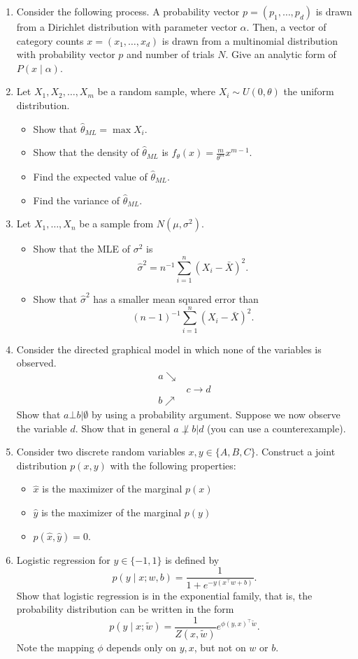 \documentclass{article}
\begin{document}
\begin{enumerate}
\item
Consider the following process.  A probability vector $p=(p_1, \ldots, p_d)$ is drawn from a Dirichlet distribution with parameter vector $\alpha$.
Then, a vector of category counts $x=(x_1, \ldots, x_d)$ is drawn from a multinomial distribution with probability vector $p$ and number of trials $N$. Give an analytic form of $P(x \mid \alpha)$.  

\item
Let $X_1, X_2, \ldots, X_m$ be a random sample, where $X_i \sim U(0,\theta)$ the uniform distribution.
\begin{itemize}
\item Show that $\hat\theta_{ML} = \max X_i$.
\item Show that the density of $\hat\theta_{ML}$ is $f_\theta(x) = \frac{m}{\theta^m} x^{m-1}$.
\item Find the expected value of $\hat\theta_{ML}$.
\item Find the variance of $\hat\theta_{ML}$.
\end{itemize}

\item
Let $X_1, \ldots, X_n$ be a sample from $N(\mu, \sigma^2)$.
\begin{itemize}
\item Show that the MLE of $\sigma^2$ is
$${\hat\sigma}^2 = n^{-1} \sum_{i=1}^n (X_i - \bar X)^2.$$
\item Show that ${\hat\sigma}^2$ has a smaller mean squared error than 
$$(n-1)^{-1} \sum_{i=1}^n (X_i - \bar X)^2.$$
\end{itemize}

\item
Consider the directed graphical model in which none of the variables is observed.  
$$
\begin{array}{cc}
a \searrow &  \\
& c \rightarrow d \\
b \nearrow &
\end{array}
$$
Show that $a \bot b \vert \emptyset$ by using a probability argument.
Suppose we now observe the variable $d$.  Show that in general $a \not\perp b \vert d$ (you can use a counterexample).

\item
Consider two discrete random variables $x,y \in \{A,B,C\}$.
Construct a joint distribution $p(x,y)$ with the following properties:
\begin{itemize}
\item $\hat x$ is the maximizer of the marginal $p(x)$
\item $\hat y$ is the maximizer of the marginal $p(y)$
\item $p(\hat x, \hat y)=0$.
\end{itemize}

\item
Logistic regression for $y\in \{-1,1\}$ is defined by
$$p(y \mid x; w,b) = \frac{1}{1+e^{-y (x^\top w + b)}}.$$
Show that logistic regression is in the exponential family, that is, the probability distribution can be written in the form
$$p(y \mid x; \tilde w) = \frac{1}{Z(x,\tilde w)} e^{\phi(y,x)^\top \tilde w}.$$
Note the mapping $\phi$ depends only on $y, x$, but not on $w$ or $b$.
\end{enumerate}
\end{document}
